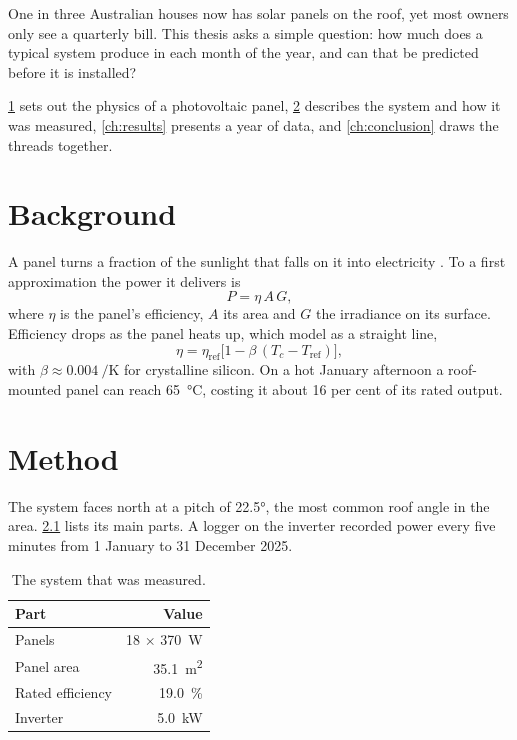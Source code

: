 \documentclass[11pt,a4paper]{report}    %
\begin{document}
One in three Australian houses now has solar panels on the roof, yet most owners only see a
quarterly bill. This thesis asks a simple question: how much does a typical system produce
in each month of the year, and can that be predicted before it is installed?

\cref{ch:background} sets out the physics of a photovoltaic panel, \cref{ch:method}
describes the system and how it was measured, \cref{ch:results} presents a year of data, and
\cref{ch:conclusion} draws the threads together.

\chapter{Background}\label{ch:background}

A panel turns a fraction of the sunlight that falls on it into electricity
\citep{Masters2013}. To a first approximation the power it delivers is
\begin{equation}\label{eq:power}
  P = \eta \, A \, G,
\end{equation}
where $\eta$ is the panel's efficiency, $A$ its area and $G$ the irradiance on its surface.
Efficiency drops as the panel heats up, which \citet{Duffie2013} model as a straight line,
\begin{equation}\label{eq:temperature}
  \eta = \eta_{\text{ref}} \bigl[ 1 - \beta \, (T_c - T_{\text{ref}}) \bigr],
\end{equation}
with $\beta \approx \qty{0.004}{\per\kelvin}$ for crystalline silicon. On a hot January
afternoon a roof-mounted panel can reach \qty{65}{\degreeCelsius}, costing it about
16 per cent of its rated output.

\chapter{Method}\label{ch:method}

The system faces north at a pitch of \ang{22.5}, the most common roof angle in the area.
\cref{tab:system} lists its main parts. A logger on the inverter recorded power every five
minutes from 1 January to 31 December 2025.

\begin{table}[ht]
  \centering
  \caption{The system that was measured.}\label{tab:system}
  \begin{tabular}{l r}
    \toprule
    Part             & Value                         \\
    \midrule
    Panels           & 18 $\times$ \qty{370}{\watt}   \\
    Panel area       & \qty{35.1}{\metre\squared}     \\
    Rated efficiency & \qty{19.0}{\percent}          \\
    Inverter         & \qty{5.0}{\kilo\watt}          \\
    \bottomrule
  \end{tabular}
\end{table}
\end{document}

